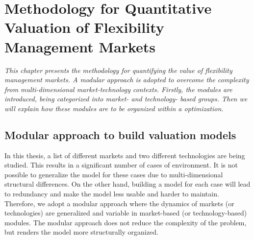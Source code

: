 \chapter{Methodology for Quantitative Valuation of Flexibility Management Markets}
\label{ch:methodology}
\textit{This chapter presents the methodology for quantifying the value of flexibility management markets. A modular approach is adopted to overcome the complexity from multi-dimensional market-technology contexts. Firstly, the modules are introduced, being categorized into market- and technology- based groups. Then we will explain how these modules are to be organized within a optimization.}

\section{Modular approach to build valuation models}
In this thesis, a list of different markets and two different technologies are being studied. This results in a significant number of cases of environment. It is not possible to generalize the model for these cases due to multi-dimensional structural differences. On the other hand, building a model for each case will lead to redundancy and make the model less usable and harder to maintain. Therefore, we adopt a modular approach where the dynamics of markets (or technologies) are generalized and variable in market-based (or technology-based) modules. The modular approach does not reduce the complexity of the problem, but renders the model more structurally organized.

